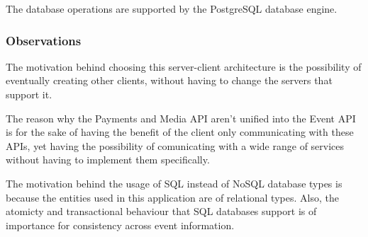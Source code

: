 The database operations are supported by the PostgreSQL database engine.

\subsubsection{Observations}

The motivation behind choosing this server-client architecture is the possibility of eventually creating other clients, without having to change the servers that support it.

The reason why the Payments and Media API aren't unified into the Event API is for the sake of having the benefit of the client only communicating with these APIs, yet having the possibility of comunicating with a wide range of services without having to implement them specifically.

The motivation behind the usage of SQL instead of NoSQL database types is because the entities used in this application are of relational types. Also, the atomicty and transactional behaviour that SQL databases support is of importance for consistency across event information.


